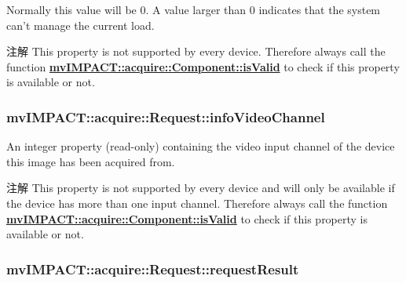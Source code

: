Normally this value will be 0. A value larger than 0 indicates that the system can't manage the current load.

\begin{DoxyNote}{注解}
This property is not supported by every device. Therefore always call the function {\bfseries \hyperlink{classmv_i_m_p_a_c_t_1_1acquire_1_1_component_ac51e55e7e046101f3c6119d84123abd5}{mv\+I\+M\+P\+A\+C\+T\+::acquire\+::\+Component\+::is\+Valid}} to check if this property is available or not. 
\end{DoxyNote}
\hypertarget{classmv_i_m_p_a_c_t_1_1acquire_1_1_request_a18a833becdf1c41fa70dac4824d5ea01}{
\subsubsection[{info\+Video\+Channel}]{ mv\+I\+M\+P\+A\+C\+T\+::acquire\+::\+Request\+::info\+Video\+Channel}}\label{classmv_i_m_p_a_c_t_1_1acquire_1_1_request_a18a833becdf1c41fa70dac4824d5ea01}


An integer property {\bfseries }(read-\/only) containing the video input channel of the device this image has been acquired from. 

\begin{DoxyNote}{注解}
This property is not supported by every device and will only be available if the device has more than one input channel. Therefore always call the function {\bfseries \hyperlink{classmv_i_m_p_a_c_t_1_1acquire_1_1_component_ac51e55e7e046101f3c6119d84123abd5}{mv\+I\+M\+P\+A\+C\+T\+::acquire\+::\+Component\+::is\+Valid}} to check if this property is available or not. 
\end{DoxyNote}
\hypertarget{classmv_i_m_p_a_c_t_1_1acquire_1_1_request_a90b174d20b986b585b37c74791726012}{
\subsubsection[{request\+Result}]{ mv\+I\+M\+P\+A\+C\+T\+::acquire\+::\+Request\+::request\+Result}}\label{classmv_i_m_p_a_c_t_1_1acquire_1_1_request_a90b174d20b986b585b37c74791726012}


